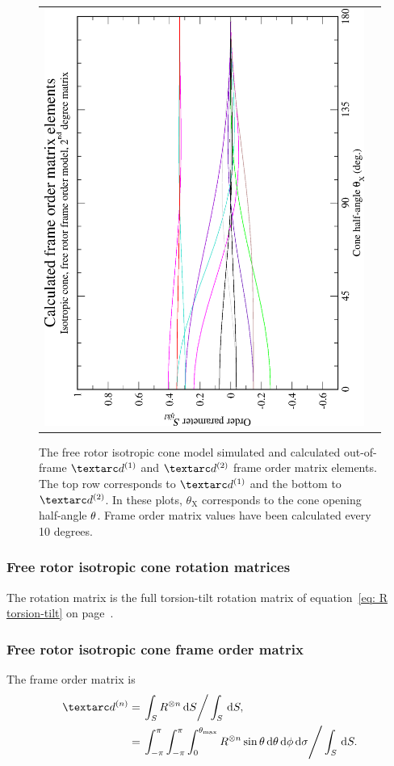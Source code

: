 \begin{figure}
\begin{tabular}{@{}cc@{}}
    \includegraphics[width=.35\textwidth,angle=270]{images/frame_order_matrix/Sijkl_iso_cone_free_rotor_out_of_frame_theta_x_calc.eps} \\
  \end{tabular}
  \caption[Free-rotor isotropic cone simulated and calculated out-of-frame $\FOone$ and $\FOtwo$ elements.]{
    The free rotor isotropic cone model simulated and calculated out-of-frame $\FOone$ and $\FOtwo$ frame order matrix elements.
    The top row corresponds to $\FOone$ and the bottom to $\FOtwo$.
    In these plots, $\theta_\textrm{X}$ corresponds to the cone opening half-angle $\theta$.
    Frame order matrix values have been calculated every 10 degrees.
  }
  \label{fig: simulated and calculated out-of-frame 1st and 2nd degree iso cone, free rotor frame order}
\end{figure}


\subsubsection{Free rotor isotropic cone rotation matrices}

The rotation matrix is the full torsion-tilt rotation matrix of equation~\ref{eq: R torsion-tilt} on page~\pageref{eq: R torsion-tilt}.

\subsubsection{Free rotor isotropic cone frame order matrix}

The frame order matrix is
\begin{subequations}
\begin{align}
    \FOn &= \left. \int_S R^{\otimes n} \diff S \right / \int_S \diff S , \\
         &= \left. \int_{-\pi}^{\pi} \int_{-\pi}^{\pi} \int_{0}^{\conethetamax} R^{\otimes n} \sin\theta \diff\theta \diff\phi \diff\sigma  \right / \int_S \diff S .
\end{align}
\end{subequations}

